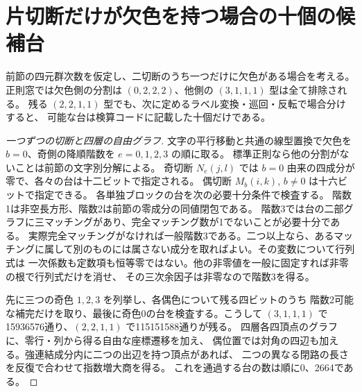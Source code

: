 \section{片切断だけが欠色を持つ場合の十個の候補台}
\label{sec:klein-single-missing-supports}
\begin{proposition}\label{prop:klein-single-missing-supports}
前節の四元群次数を仮定し、二切断のうち一つだけに欠色がある場合を考える。
正則窓では欠色側の分割は $(0,2,2,2)$、他側の $(3,1,1,1)$ 型は全て排除される。
残る $(2,2,1,1)$ 型でも、次に定めるラベル変換・巡回・反転で場合分けすると、
可能な台は検算コードに記載した十個だけである。
\end{proposition}
\begin{proof}[一つずつの切断と四層の自由グラフ]
文字の平行移動と共通の線型置換で欠色を $b=0$、奇側の降順階数を $e=0,1,2,3$ の順に取る。
標準正則なら他の分割がないことは前節の文字別分解による。
奇切断 $N_e(j,l)$ では $b=0$ 由来の四成分が零で、各々の台は十二ビットで指定される。
偶切断 $M_b(i,k)$, $b\ne0$ は十六ビットで指定できる。
各単独ブロックの台を次の必要十分条件で検査する。
階数1は非空長方形、階数2は前節の零成分の同値閉包である。
階数3では台の二部グラフに三マッチングがあり、完全マッチング数が1でないことが必要十分である。
実際完全マッチングがなければ一般階数3である。二つ以上なら、あるマッチングに属して別のものには属さない成分を取ればよい。その変数について行列式は
一次係数も定数項も恒等零ではない。他の非零値を一般に固定すれば非零の根で行列式だけを消せ、
その三次余因子は非零なので階数3を得る。

先に三つの奇色 $1,2,3$ を列挙し、各偶色について残る四ビットのうち
階数2可能な補完だけを取り、最後に奇色0の台を検査する。こうして
$(3,1,1,1)$ で15936576通り、$(2,2,1,1)$ で115151588通りが残る。
四層各四頂点のグラフに、零行・列から得る自由な座標遷移を加え、
偶位置では対角の四辺も加える。強連結成分内に二つの出辺を持つ頂点があれば、
二つの異なる閉路の長さを反復で合わせて指数増大商を得る。
これを通過する台の数は順に0、2664である。
\end{proof}

